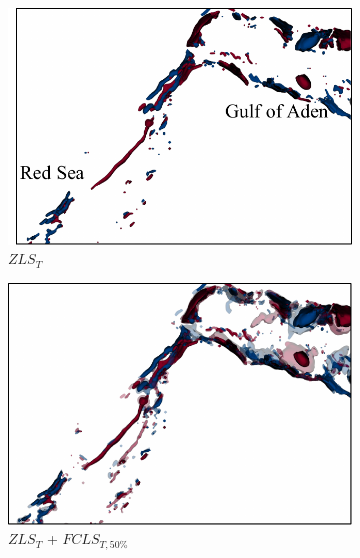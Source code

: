 \begin{figure}[!h]
\begin{subfigure}{0.245\linewidth}
\centering
\includegraphics[width=\linewidth]{Images/RedSeaEddy/zls.pdf}
\vspace{-2mm}
\caption{$ZLS_{T}$}
\label{fig:rse_zls}
\end{subfigure}
\begin{subfigure}{0.245\linewidth}
\centering
\includegraphics[width=\linewidth]{Images/RedSeaEddy/fcls_50.pdf}
\vspace{-2mm}
\caption{$ZLS_{T}$ + $FCLS_{T,50\%}$}
\label{fig:rse_fls}
\end{subfigure}
\begin{subfigure}{0.245\linewidth}
\centering

\end{subfigure}
\end{figure}
